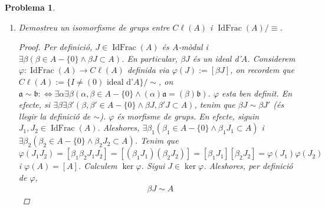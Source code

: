 \documentclass{article}
\DeclareMathOperator{\Quot}{Quot}
\DeclareMathOperator{\IdFrac}{IdFrac}
\newtheorem{problema}{Problema}
\begin{document}
\begin{problema}
\begin{enumerate}
\begin{proof}
            Veiem la simetria. Siguin $I_{1},I_{2}\in\IdFrac(A)$. Suposem que $I_{1}\equiv I_{2}:\iff\exists\alpha(\alpha\in\Quot(A)^{*}\land I_{1}I_{2}^{-1}=\alpha A)$. Tenim que $I_{2}I_{1}^{-1}=\alpha^{-1}\alpha AI_{2}I_{1}^{-1}=\alpha^{-1}I_{1}I_{2}^{-1}I_{2}I_{1}^{-1}=\alpha^{-1}A$, d'on deduïm que $I_{2}\equiv I_{1}$.\newline
            Veiem la transitivitat. Suposem que $I_{1}\equiv I_{2}:\iff\exists\alpha(\alpha\in\Quot(A)^{*}\land I_{1}I_{2}^{-1}=\alpha A)$ i $I_{2}\equiv I_{3}:\iff\exists\alpha'(\alpha'\in\Quot(A)^{*}\land I_{2}I_{3}^{-1}=\alpha' A)$. Aleshores, $I_{1}I_{3}^{-1}=I_{1}I_{2}^{-1}I_{2}I_{3}^{-1}=(\alpha A)(\alpha' A)=\alpha\alpha' A$, d'on $I_{1}\equiv I_{3}$. Per tant, $\equiv$ defineix una relació d'equivalència en $\IdFrac(A)$.\newline
            Tot quocient d'un grup abelià és abelià, d'on $\IdFrac(A)/\equiv$ és un grup abelià.
        \end{proof}
        \item Demostreu un isomorfisme de grups entre $C\ell(A)$ i $\IdFrac(A)/\equiv$.
        \begin{proof}
            Per definició, $J\in\IdFrac(A)$ és $A$-mòdul i $\exists\beta(\beta\in A-\{0\}\land\beta J\subset A)$. En particular, $\beta J$ és un ideal d'$A$. Considerem $\varphi:\IdFrac(A)\rightarrow C\ell(A)$ definida via $\varphi(J):=[\beta J]$, on recordem que $C\ell(A):=\{I\neq(0)\textrm{ ideal d'}A\}/\sim$, on $\mathfrak{a}\sim\mathfrak{b}:\iff\exists\alpha\exists\beta(\alpha,\beta\in A-\{0\}\land(\alpha)\mathfrak{a}=(\beta)\mathfrak{b})$.\newline
            $\varphi$ esta ben definit. En efecte, si $\exists\beta\exists\beta'(\beta,\beta'\in A-\{0\}\land\beta J,\beta' J\subset A)$, tenim que $\beta J\sim\beta J'$ (és llegir la definició de $\sim$).\newline
            $\varphi$ és morfisme de grups. En efecte, siguin $J_{1},J_{2}\in\IdFrac(A)$. Aleshores, $\exists\beta_{1}(\beta_{1}\in A-\{0\}\land\beta_{1}J_{1}\subset A)$ i $\exists\beta_{2}(\beta_{2}\in A-\{0\}\land\beta_{2}J_{2}\subset A)$. Tenim que $\varphi(J_{1}J_{2})=[\beta_{1}\beta_{2}J_{1}J_{2}]=[(\beta_{1}J_{1})(\beta_{2}J_{2})]=[\beta_{1}J_{1}][\beta_{2}J_{2}]=\varphi(J_{1})\varphi(J_{2})$ i $\varphi(A)=[A]$.\newline
            Calculem $\ker{\varphi}$. Sigui $J\in\ker{\varphi}$. Aleshores, per definició de $\varphi$,
            \begin{align*}
                \beta J\sim A

\end{align*}
\end{proof}
\end{enumerate}
\end{problema}
\end{document}

